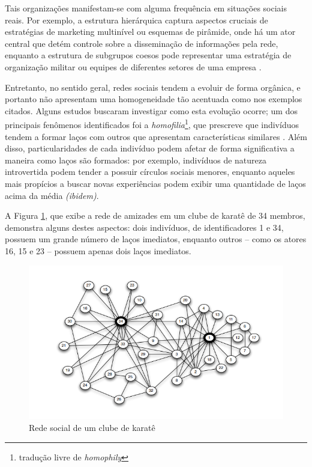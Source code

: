 Tais organizações manifestam-se com alguma frequência em situações sociais reais. Por exemplo, a estrutura hierárquica captura aspectos cruciais de estratégias de marketing multinível ou esquemas de pirâmide, onde há um ator central que detém controle sobre a disseminação de informações pela rede, enquanto a estrutura de subgrupos coesos pode representar uma estratégia de organização militar ou equipes de diferentes setores de uma empresa \cite{Christakis2007}.

Entretanto, no sentido geral, redes sociais tendem a evoluir de forma orgânica, e portanto não apresentam uma homogeneidade tão acentuada como nos exemplos citados. Alguns estudos buscaram investigar como esta evolução ocorre; um dos principais fenômenos identificados foi a \emph{homofilia}\footnote{tradução livre de \textit{homophily}}, que prescreve que indivíduos tendem a formar laços com outros que apresentam características similares \cite{McPherson2001}. Além disso, particularidades de cada indivíduo podem afetar de forma significativa a maneira como laços são formados: por exemplo, indivíduos de natureza introvertida podem tender a possuir círculos sociais menores, enquanto aqueles mais propícios a buscar novas experiências podem exibir uma quantidade de laços acima da média \textit{(ibidem)}.

A Figura \ref{fig:karate}, que exibe a rede de amizades em um clube de karatê de 34 membros, demonstra alguns destes aspectos: dois indivíduos, de identificadores 1 e 34, possuem um grande número de laços imediatos, enquanto outros -- como os atores 16, 15 e 23 -- possuem apenas dois laços imediatos.

\begin{figure}[ht]
    \centering
    \includegraphics[width=15cm]{imagens/karate.png}
    \caption{Rede social de um clube de karatê}
    \label{fig:karate}
\end{figure}

